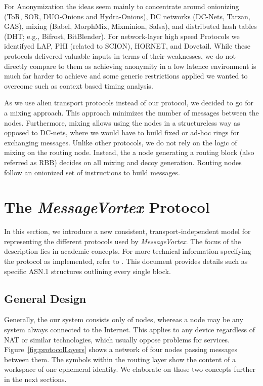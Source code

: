 \documentclass[acmsmall, screen]{acmart}
\begin{document}
For Anonymization the ideas seem mainly to concentrate around onionizing (ToR\cite{tor-spec}, SOR\cite{Egners_2012}, DUO-Onions and Hydra-Onions\cite{iwanik2005duo}), DC networks (DC-Nets\cite{chaum-dc}, Tarzan\cite{tarzan:ccs02}, GAS\cite{AthanRAM07}), mixing (Babel\cite{babel}, MorphMix\cite{morphmix:wpes2002}, Mixminion\cite{minion-design}, Salsa\cite{Salsa}), and distributed hash tables (DHT; e.g., Bifrost\cite{Kondo2009}, BitBlender\cite{Bauer_2008}). For network-layer high speed Protocols we identifyed LAP\cite{hsiao2012lap}, PHI (related to SCION\cite{perrig2017scion}), HORNET\cite{chen2015hornet}, and Dovetail\cite{chen2015hornet}. While these protocols delivered valuable inputs in terms of their weaknesses, we do not directly compare to them as achieving anonymity in a low latence environment is much far harder to achieve and some generic restrictions applied we wanted to overcome such as context based timing analysis.

As we use alien transport protocols instead of our protocol, we decided to go for a mixing approach. This approach minimizes the number of messages between the nodes. Furthermore, mixing allows using the nodes in a structureless way as opposed to DC-nets, where we would have to build fixed or ad-hoc rings for exchanging messages. Unlike other protocols, we do not rely on the logic of mixing on the routing node. Instead, the a node generating a routing block (also referred as RBB) decides on all mixing and decoy generation. Routing nodes follow an onionized set of instructions to build messages. 


\section{The \emph{MessageVortex} Protocol\label{sec:protocol}}
 In this section, we introduce a new consistent, transport-independent model for representing the different protocols used by \emph{MessageVortex}. The focus of the description lies in academic concepts. For more technical information specifying the protocol as implemented, refer to \cite{MessageVortexRFC}. This document provides details such as specific ASN.1 structures outlining every single block.

\subsection{General Design}
Generally, the our system consists only of nodes, whereas a node may be any system always connected to the Internet. This applies to any device regardless of NAT or similar technologies, which usually oppose problems for services. Figure~\ref{fig:protocolLayers} shows a network of four nodes passing messages between them. The symbols within the routing layer show the content of a workspace of one ephemeral identity. We elaborate on those two concepts further in the next sections. 
\end{document}
